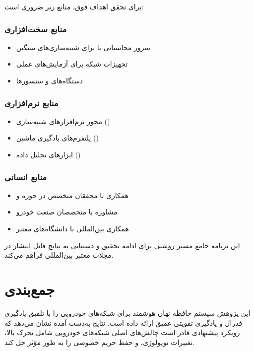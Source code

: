 \documentclass[11pt]{article}
\begin{document}
برای تحقق اهداف فوق، منابع زیر ضروری است:

\subsubsection{منابع سخت‌افزاری}
\begin{itemize}
\item سرور محاسباتی با  برای شبیه‌سازی‌های سنگین
\item تجهیزات شبکه برای آزمایش‌های عملی
\item دستگاه‌های  و سنسورها
\end{itemize}

\subsubsection{منابع نرم‌افزاری}
\begin{itemize}
\item مجوز نرم‌افزارهای شبیه‌سازی ()
\item پلتفرم‌های یادگیری ماشین ()
\item ابزارهای تحلیل داده ()
\end{itemize}

\subsubsection{منابع انسانی}
\begin{itemize}
\item همکاری با محققان متخصص در حوزه  و 
\item مشاوره با متخصصان صنعت خودرو
\item همکاری بین‌المللی با دانشگاه‌های معتبر
\end{itemize}

این برنامه جامع مسیر روشنی برای ادامه تحقیق و دستیابی به نتایج قابل انتشار در مجلات معتبر بین‌المللی فراهم می‌کند.

\section{جمع‌بندی}

این پژوهش سیستم حافظه نهان هوشمند برای شبکه‌های خودرویی را با تلفیق یادگیری فدرال و یادگیری تقویتی عمیق ارائه داده است. نتایج به‌دست آمده نشان می‌دهد که رویکرد پیشنهادی قادر است چالش‌های اصلی شبکه‌های خودرویی شامل تحرک بالا، تغییرات توپولوژی، و حفظ حریم خصوصی را به طور مؤثر حل کند.
\end{document}
